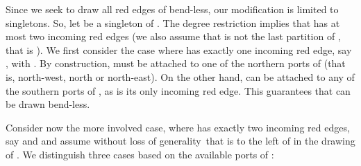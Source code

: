 \documentclass[a4paper,twoside,11pt]{article}
\begin{document}
Since we seek to draw all red edges of  bend-less, our
modification is limited to singletons. So, let  be
a singleton of . The degree restriction implies that  has
at most two incoming red edges (we also assume that  is not the
last partition of , that is ). We first consider the
case where  has exactly one incoming red edge, say
, with . By construction,  must be attached to
one of the northern ports of  (that is, north-west, north or
north-east). On the other hand,  can be attached to any of
the southern ports of , as  is its only incoming red edge.
This guarantees that  can be drawn bend-less.

Consider now the more involved case, where  has exactly two
incoming red edges, say  and  and
assume without loss of generality~that  is to the left of
 in the drawing of . We distinguish three cases
based on the available ports of :
\end{document}
